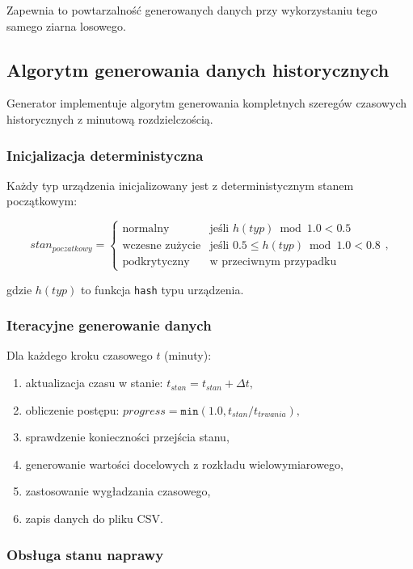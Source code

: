 Zapewnia to powtarzalność generowanych danych przy wykorzystaniu tego samego ziarna losowego.

\subsection{Algorytm generowania danych historycznych}
\label{subsec:algorytm_historycznych}

Generator implementuje algorytm generowania kompletnych szeregów czasowych historycznych z minutową rozdzielczością.

\subsubsection{Inicjalizacja deterministyczna}

Każdy typ urządzenia inicjalizowany jest z deterministycznym stanem początkowym:

$$stan_{poczatkowy} = \begin{cases}
\text{normalny} & \text{je\'sli } h(typ) \bmod 1.0 < 0.5 \\
\text{wczesne zu\.{z}ycie} & \text{je\'sli } 0.5 \leq h(typ) \bmod 1.0 < 0.8 \\
\text{podkrytyczny} & \text{w przeciwnym przypadku}
\end{cases},$$

gdzie $h(typ)$ to funkcja \texttt{hash} typu urządzenia.

\subsubsection{Iteracyjne generowanie danych}

Dla każdego kroku czasowego $t$ (minuty):

\begin{enumerate}
    \item aktualizacja czasu w stanie: $t_{stan} = t_{stan} + \Delta t,$
    \item obliczenie postępu: $progress = \texttt{min}(1.0, t_{stan} / t_{trwania}),$
    \item sprawdzenie konieczności przejścia stanu,
    \item generowanie wartości docelowych z rozkładu wielowymiarowego,
    \item zastosowanie wygładzania czasowego,
    \item zapis danych do pliku CSV.
\end{enumerate}

\subsubsection{Obsługa stanu naprawy}

